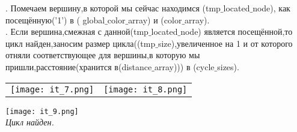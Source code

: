 \documentclass[a4paper,11pt]{article}
\begin{document}
\begin{flushleft}
{. Помечаем вершину,в которой мы сейчас находимся (tmp$\_$located$\_$node), как посещённую('1') в ( global$\_$color$\_$array) и (color$\_$array). \\
. Если вершина,смежная с данной(tmp$\_$located$\_$node) является посещённой,то цикл найден,заносим размер цикла((tmp$\_$size),увеличенное на 1 и от которого отняли соответствующее для вершины,в которую мы пришли,расстояние(хранится в(distance$\_$array))) в (cycle$\_$sizes). \\}
\begin{tabulary}{\linewidth}{}
  \texttt{[image: it\_7.png]} 
  &
  \texttt{[image: it\_8.png]}
   \\                                                     
\end{tabulary}
\end{flushleft} 
\texttt{[image: it\_9.png]} \\ \textit{Цикл найден.} \\
\end{document}
